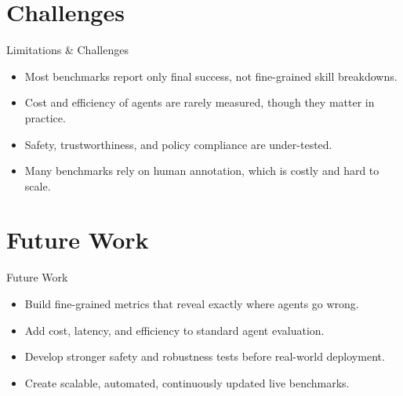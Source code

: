 \documentclass[10pt]{beamer}
\begin{document}
\section{Challenges}
\begin{frame}{Limitations \& Challenges}
\begin{itemize}
  \item Most benchmarks report only final success, not fine-grained skill breakdowns.
  \item Cost and efficiency of agents are rarely measured, though they matter in practice.
  \item Safety, trustworthiness, and policy compliance are under-tested.
  \item Many benchmarks rely on human annotation, which is costly and hard to scale.
\end{itemize}
\end{frame}
\section{Future Work}
\begin{frame}{Future Work}
\begin{itemize}
  \item Build fine-grained metrics that reveal exactly where agents go wrong.
  \item Add cost, latency, and efficiency to standard agent evaluation.
  \item Develop stronger safety and robustness tests before real-world deployment.
  \item Create scalable, automated, continuously updated live benchmarks.
\end{itemize}
\end{frame}
\end{document}
